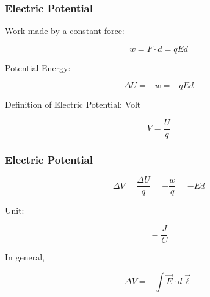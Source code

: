 \documentclass[]{beamer}
\begin{document}






\begin{frame}
\frametitle{Electric Potential}

Work made by a constant force:

\begin{equation}
w=F\cdot d=q E d
\end{equation}

\pause

Potential Energy:

\begin{equation}
\Delta U = -w=- q E d
\end{equation}
\pause

Definition of  Electric Potential: Volt

\begin{equation}
V=\frac{U}{q}
\end{equation}



  \end{frame}





\begin{frame}
\frametitle{Electric Potential}

\begin{equation}
\Delta V=\frac{\Delta U}{q}=-\frac{w}{q}=-Ed
\end{equation}


\pause

Unit:

\begin{equation}
[V]=\frac{J}{C}
\end{equation}

\pause

In general,


\begin{equation}
\Delta V=-\int \vec{E}\cdot d \vec{\ell}
\end{equation}



  \end{frame}



\end{document}
